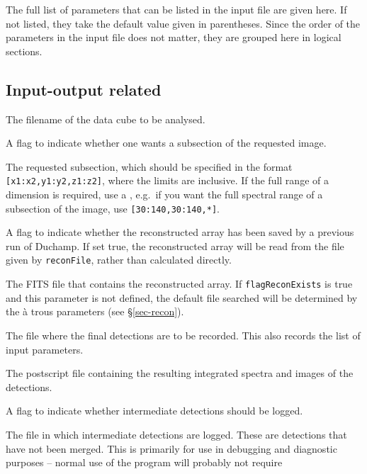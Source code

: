 \documentclass[12pt,a4paper]{article}
\newcommand{\eg}{e.g.\ }
\newcommand{\entrylabel}[1]{\mbox{\textsf{\bf{#1:}}}\hfil}
\newenvironment{entry}
        {\begin{list}{}%
                {\renewcommand{\makelabel}{\entrylabel}%
                        \setlength{\labelwidth}{30mm}%
                        \setlength{\labelsep}{5pt}%
                        \setlength{\itemsep}{2pt}%
                        \setlength{\parsep}{2pt}%
                        \setlength{\leftmargin}{35mm}%
                }%
        }%
{\end{list}}
\begin{document}
The full list of parameters that can be listed in the input file are
given here. If not listed, they take the default value given in
parentheses. Since the order of the parameters in the input file does
not matter, they are grouped here in logical sections.

\subsection*{Input-output related}
\begin{entry}
\item[ImageFile (no default assumed)] The filename of the
  data cube to be analysed.
\item[flagSubsection {\tt [false]}] A flag to indicate whether one
  wants a subsection of the requested image.
\item[Subsection {\tt [ [*,*,*] ]}] The requested subsection, which
  should be specified in the format {\tt [x1:x2,y1:y2,z1:z2]}, where
  the limits are inclusive. If the full range of a dimension is
  required, use a {\tt *}, \eg if you want the full spectral range of
  a subsection of the image, use {\tt [30:140,30:140,*]}.
\item[flagReconExists {\tt [false]}] A flag to indicate whether the
  reconstructed array has been saved by a previous run of Duchamp. If
  set true, the reconstructed array will be read from the file given by
  {\tt reconFile}, rather than calculated directly.
\item[reconFile (no default assumed)] The FITS file that contains the
  reconstructed array. If {\tt flagReconExists} is true and this
  parameter is not defined, the default file searched will be
  determined by the {\`a} trous parameters (see \S\ref{sec-recon}).
\item[OutFile {\tt [duchamp-Results.txt]}] The file where the final
  detections are to be recorded. This also records the list of input
  parameters.
\item[SpectraFile {\tt [duchamp-Spectra.ps]}] The postscript file
  containing the resulting integrated spectra and images of the
  detections. 
\item[flagLog {\tt [true]}] A flag to indicate whether intermediate
  detections should be logged.
\item[LogFile {\tt [duchamp-Logfile.txt]}] The file in which intermediate
  detections are logged. These are detections that have not been
  merged. This is primarily for use in debugging and diagnostic
  purposes -- normal use of the program will probably not require

\end{entry}
\end{document}
